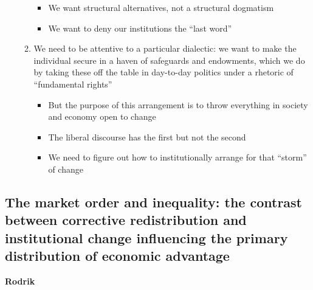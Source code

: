 \begin{itemize}
\begin{enumerate}
    \begin{itemize}
    \tightlist
    \item
      We want structural alternatives, not a structural dogmatism
    \item
      We want to deny our institutions the ``last word''
    \end{itemize}
  \item
    We need to be attentive to a particular dialectic: we want to make
    the individual secure in a haven of safeguards and endowments, which
    we do by taking these off the table in day-to-day politics under a
    rhetoric of ``fundamental rights''

    \begin{itemize}
    \tightlist
    \item
      But the purpose of this arrangement is to throw everything in
      society and economy open to change
    \item
      The liberal discourse has the first but not the second
    \item
      We need to figure out how to institutionally arrange for that
      ``storm'' of change
    \end{itemize}
  \end{enumerate}
\end{itemize}

\hypertarget{the-market-order-and-inequality-the-contrast-between-corrective-redistribution-and-institutional-change-influencing-the-primary-distribution-of-economic-advantage}{%
\subsection{The market order and inequality: the contrast between
corrective redistribution and institutional change influencing the
primary distribution of economic
advantage}\label{the-market-order-and-inequality-the-contrast-between-corrective-redistribution-and-institutional-change-influencing-the-primary-distribution-of-economic-advantage}}

\textbf{Rodrik}

